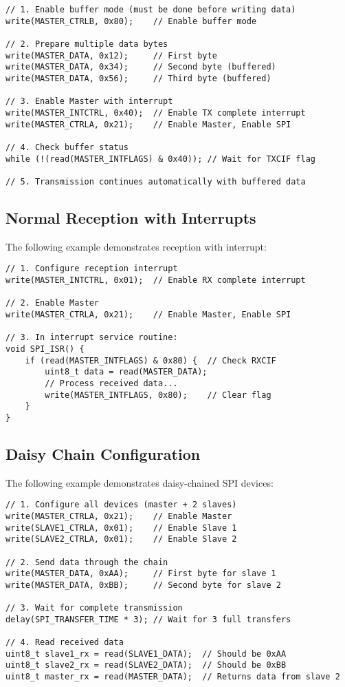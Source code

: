 \begin{verbatim}
// 1. Enable buffer mode (must be done before writing data)
write(MASTER_CTRLB, 0x80);    // Enable buffer mode

// 2. Prepare multiple data bytes
write(MASTER_DATA, 0x12);     // First byte
write(MASTER_DATA, 0x34);     // Second byte (buffered)
write(MASTER_DATA, 0x56);     // Third byte (buffered)

// 3. Enable Master with interrupt
write(MASTER_INTCTRL, 0x40);  // Enable TX complete interrupt
write(MASTER_CTRLA, 0x21);    // Enable Master, Enable SPI

// 4. Check buffer status
while (!(read(MASTER_INTFLAGS) & 0x40)); // Wait for TXCIF flag

// 5. Transmission continues automatically with buffered data
\end{verbatim}

\subsection{Normal Reception with Interrupts}
The following example demonstrates reception with interrupt:

\begin{verbatim}
// 1. Configure reception interrupt
write(MASTER_INTCTRL, 0x01);  // Enable RX complete interrupt

// 2. Enable Master
write(MASTER_CTRLA, 0x21);    // Enable Master, Enable SPI

// 3. In interrupt service routine:
void SPI_ISR() {
    if (read(MASTER_INTFLAGS) & 0x80) {  // Check RXCIF
        uint8_t data = read(MASTER_DATA);
        // Process received data...
        write(MASTER_INTFLAGS, 0x80);    // Clear flag
    }
}
\end{verbatim}

\subsection{Daisy Chain Configuration}
The following example demonstrates daisy-chained SPI devices:

\begin{verbatim}
// 1. Configure all devices (master + 2 slaves)
write(MASTER_CTRLA, 0x21);    // Enable Master
write(SLAVE1_CTRLA, 0x01);    // Enable Slave 1
write(SLAVE2_CTRLA, 0x01);    // Enable Slave 2

// 2. Send data through the chain
write(MASTER_DATA, 0xAA);     // First byte for slave 1
write(MASTER_DATA, 0xBB);     // Second byte for slave 2

// 3. Wait for complete transmission
delay(SPI_TRANSFER_TIME * 3); // Wait for 3 full transfers

// 4. Read received data
uint8_t slave1_rx = read(SLAVE1_DATA);  // Should be 0xAA
uint8_t slave2_rx = read(SLAVE2_DATA);  // Should be 0xBB
uint8_t master_rx = read(MASTER_DATA);  // Returns data from slave 2
\end{verbatim}
